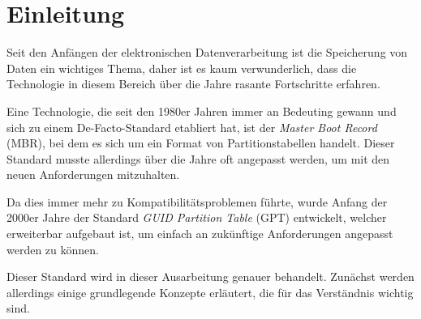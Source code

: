 \section{Einleitung}
Seit den Anfängen der elektronischen Datenverarbeitung ist die Speicherung von Daten ein wichtiges Thema, daher ist es kaum verwunderlich, dass die Technologie in diesem Bereich über die Jahre rasante Fortschritte erfahren.

Eine Technologie, die seit den 1980er Jahren immer an Bedeuting gewann und sich zu einem De-Facto-Standard etabliert hat, ist der \textit{Master Boot Record} (MBR), bei dem es sich um ein Format von Partitionstabellen handelt.
Dieser Standard musste allerdings über die Jahre oft angepasst werden, um mit den neuen Anforderungen mitzuhalten.

Da dies immer mehr zu Kompatibilitätsproblemen führte, wurde Anfang der 2000er Jahre der Standard \textit{GUID Partition Table} (GPT) entwickelt, welcher erweiterbar aufgebaut ist, um einfach an zukünftige Anforderungen angepasst werden zu können.

Dieser Standard wird in dieser Ausarbeitung genauer behandelt.
Zunächst werden allerdings einige grundlegende Konzepte erläutert, die für das Verständnis wichtig sind.
